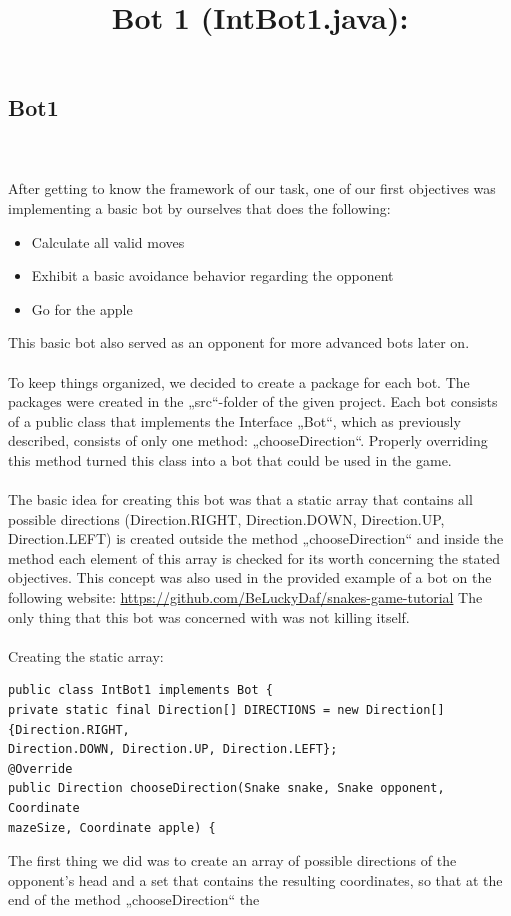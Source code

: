 \documentclass[a4paper,12pt]{article}
\begin{document}
\subsection{Bot1}
\title{Bot 1 (IntBot1.java):}\\
\\
After getting to know the framework of our task, one of our first objectives was implementing a
basic bot by ourselves that does the following:\\
\begin{itemize}
\item Calculate all valid moves
\item Exhibit a basic avoidance behavior regarding the opponent
\item Go for the apple
\end{itemize}
This basic bot also served as an opponent for more advanced bots later on.\\
\\
To keep things organized, we decided to create a package for each bot. The packages were created
in the „src“-folder of the given project. Each bot consists of a public class that implements the
Interface „Bot“, which as previously described, consists of only one method: „chooseDirection“.
Properly overriding this method turned this class into a bot that could be used in the game.
\\
\\
The basic idea for creating this bot was that a static array that contains all possible directions
(Direction.RIGHT, Direction.DOWN, Direction.UP, Direction.LEFT) is created outside the method
„chooseDirection“ and inside the method each element of this array is checked for its worth
concerning the stated objectives. This concept was also used in the provided example of  a bot  on the following website: \url{https://github.com/BeLuckyDaf/snakes-game-tutorial} The only thing that this bot was concerned with was not killing itself.\\
\\
Creating the static array:
\begin{verbatim}
public class IntBot1 implements Bot {
private static final Direction[] DIRECTIONS = new Direction[]{Direction.RIGHT,
Direction.DOWN, Direction.UP, Direction.LEFT};
@Override
public Direction chooseDirection(Snake snake, Snake opponent, Coordinate
mazeSize, Coordinate apple) {
\end{verbatim}
The first thing we did was to create an array of possible directions of the opponent’s head and a set
that contains the resulting coordinates, so that at the end of the method „chooseDirection“ the
\end{document}
